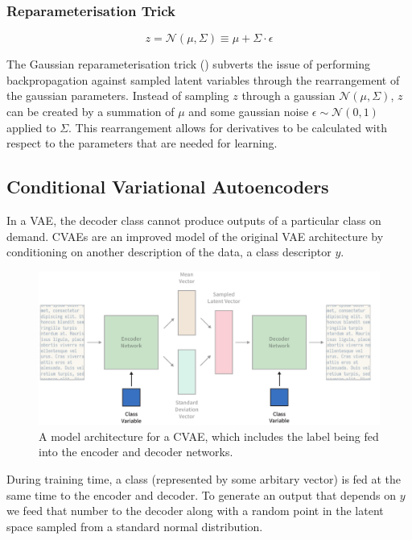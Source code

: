 \documentclass[12pt,twoside]{report}
\begin{document}
\subsubsection*{Reparameterisation Trick}

$$z = \mathcal{N}(\mu, \Sigma) \equiv \mu + \Sigma \cdot \epsilon $$ 


The Gaussian reparameterisation trick (\cite{kingma_auto-encoding_2013}) subverts the issue of performing backpropagation against sampled latent variables through the rearrangement of the gaussian parameters. Instead of sampling $z$ through a gaussian $\mathcal{N}(\mu, \Sigma)$, $z$ can be created by a summation of $\mu$ and some gaussian noise $\epsilon \sim \mathcal{N}(0,1)$ applied to $\Sigma$. This rearrangement allows for derivatives to be calculated with respect to the parameters that are needed for learning.


\subsection{Conditional Variational Autoencoders}

In a VAE, the decoder class cannot produce outputs of a particular class on demand. CVAEs are an improved model of the original VAE architecture by conditioning on another description of the data, a class descriptor $y$. 

\begin{figure}[!ht]
      
	\centering
	\includegraphics[width=150mm]{diagrams/conditional_variational_autoencoders.pdf}
	\caption{A model architecture for a CVAE, which includes the label being fed into the encoder and decoder networks. \label{cvae_diagram}}
  \end{figure}

During training time, a class (represented by some arbitary vector) is fed at the same time to the encoder and decoder. To generate an output that depends on $y$ we feed that number to the decoder along with a random point in the latent space sampled from a standard normal distribution.
\end{document}
